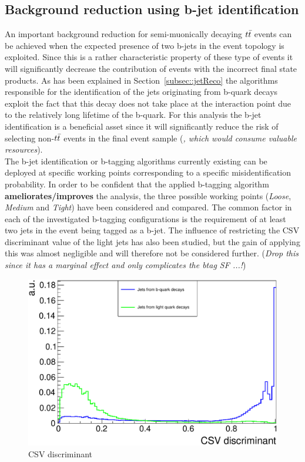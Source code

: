 \subsection{Background reduction using b-jet identification}
An important background reduction for semi-muonically decaying $t\bar{t}$ events can be achieved when the expected presence of two b-jets in the event topology is exploited. Since this is a rather characteristic property of these type of events it will significantly decrease the contribution of events with the incorrect final state products.
As has been explained in Section~\ref{subsec::jetReco} the algorithms responsible for the identification of the jets originating from b-quark decays exploit the fact that this decay does not take place at the interaction point due to the relatively long lifetime of the b-quark.
For this analysis the b-jet identification is a beneficial asset since it will significantly reduce the risk of selecting non-$t\bar{t}$ events in the final event sample (\textit{, which would consume valuable resources}).
\\

The b-jet identification or b-tagging algorithms currently existing can be deployed at specific working points corresponding to a specific misidentification probability. In order to be confident that the applied b-tagging algorithm \textbf{ameliorates/improves} the analysis, the three possible working points (\textit{Loose}, \textit{Medium} and \textit{Tight}) have been considered and compared.
The common factor in each of the investigated b-tagging configurations is the requirement of at least two jets in the event being tagged as a b-jet.
The influence of restricting the CSV discriminant value of the light jets has also been studied, but the gain of applying this was almost negligible and will therefore not be considered further. (\textit{Drop this since it has a marginal effect and only complicates the btag SF ...!})

\begin{figure}[h!t]
 \centering
 \includegraphics[width = 0.85 \textwidth]{Chapters/Chapter4_EvtSel/Figures/CSVDiscr_LightAndBJets.pdf}
 \caption{CSV discriminant} \label{fig::CSVDiscr}
\end{figure}

